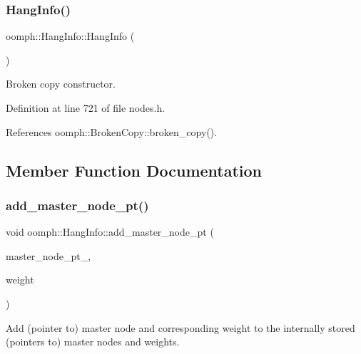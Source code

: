 \subsubsection{\texorpdfstring{Hang\+Info()}{HangInfo()}\hspace{0.1cm}{\footnotesize\ttfamily [3/3]}}
{\footnotesize\ttfamily oomph\+::\+Hang\+Info\+::\+Hang\+Info (\begin{DoxyParamCaption}\item[{const \hyperlink{classoomph_1_1HangInfo}{Hang\+Info} \&}]{ }\end{DoxyParamCaption})\hspace{0.3cm}{\ttfamily [inline]}}



Broken copy constructor. 



Definition at line 721 of file nodes.\+h.



References oomph\+::\+Broken\+Copy\+::broken\+\_\+copy().



\subsection{Member Function Documentation}
\mbox{\label{classoomph_1_1HangInfo_af7b5808b80bc4438726383e81a1b1e3c}} 
\subsubsection{\texorpdfstring{add\+\_\+master\+\_\+node\+\_\+pt()}{add\_master\_node\_pt()}}
{\footnotesize\ttfamily void oomph\+::\+Hang\+Info\+::add\+\_\+master\+\_\+node\+\_\+pt (\begin{DoxyParamCaption}\item[{\hyperlink{classoomph_1_1Node}{Node} $\ast$const \&}]{master\+\_\+node\+\_\+pt\+\_\+,  }\item[{const double \&}]{weight }\end{DoxyParamCaption})}



Add (pointer to) master node and corresponding weight to the internally stored (pointers to) master nodes and weights. 

